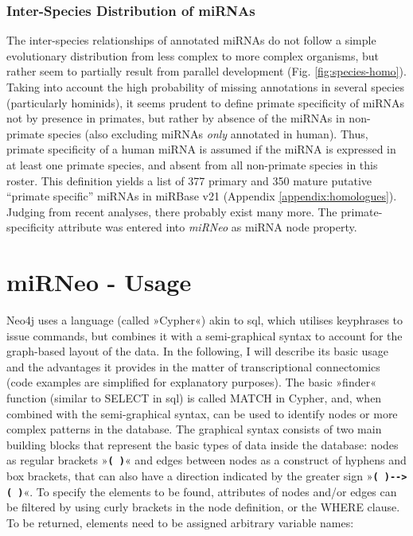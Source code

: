 \subsubsection{Inter-Species Distribution of miRNAs}
The inter-species relationships of annotated miRNAs do not follow a simple evolutionary distribution from less complex to more complex organisms, but rather seem to partially result from parallel development (Fig. \ref{fig:species-homo}). Taking into account the high probability of missing annotations in several species (particularly hominids), it seems prudent to define primate specificity of miRNAs not by presence in primates, but rather by absence of the miRNAs in non-primate species (also excluding miRNAs \emph{only} annotated in human). Thus, primate specificity of a human miRNA is assumed if the miRNA is expressed in at least one primate species, and absent from all non-primate species in this roster. This definition yields a list of 377 primary and 350 mature putative “primate specific” miRNAs in miRBase v21 (Appendix \ref{appendix:homologues}). Judging from recent analyses,\cite{Londin2015} there probably exist many more. The primate-specificity attribute was entered into \emph{miRNeo} as miRNA node property.


\section{miRNeo - Usage} \label{sec:database:usage}
Neo4j uses a language (called »Cypher«) akin to \ac{sql}, which utilises keyphrases to issue commands, but combines it with a semi-graphical syntax to account for the graph-based layout of the data. In the following, I will describe its basic usage and the advantages it provides in the matter of transcriptional connectomics (code examples are simplified for explanatory purposes). The basic »finder« function (similar to \textcolor{dkblue}{SELECT} in \ac{sql}) is called \textcolor{dkblue}{MATCH} in Cypher, and, when combined with the semi-graphical syntax, can be used to identify nodes or more complex patterns in the database. The graphical syntax consists of two main building blocks that represent the basic types of data inside the database: nodes as regular brackets »\textbf{\texttt{( )}}« and edges between nodes as  a construct of hyphens and box brackets, that can also have a direction indicated by the greater sign \mbox{»\textbf{\texttt{( )-\string[ \string]->( )}}«}. To specify the elements to be found, attributes of nodes and/or edges can be filtered by using curly brackets in the node definition, or the \textcolor{dkblue}{WHERE} clause. To be returned, elements need to be assigned arbitrary variable names:

